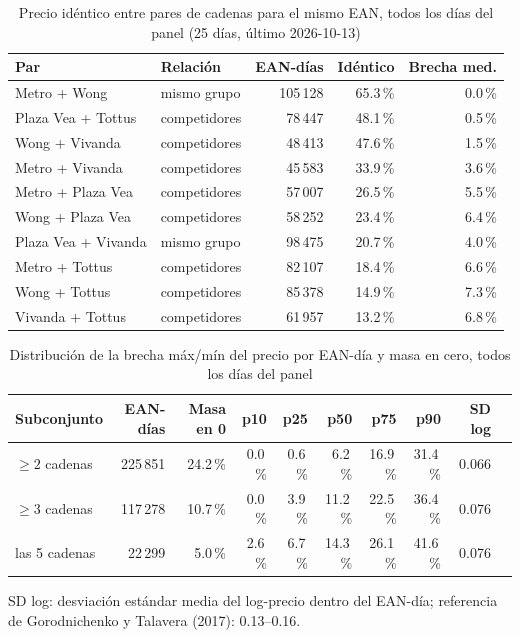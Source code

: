 
\begin{table}[htbp]
\caption{Precio id\'entico entre pares de cadenas para el mismo EAN, todos los d\'ias del panel (25 d\'ias, \'ultimo 2026-10-13)}
\label{tab:identidad}
\centering\scriptsize\setlength{\tabcolsep}{3pt}
\begin{tabular}{@{}llrrr@{}}
\toprule
Par & Relaci\'on & EAN-d\'ias & Id\'entico & Brecha med. \\
\midrule
Metro + Wong & mismo grupo & 105\,128 & 65.3\,\% & 0.0\,\% \\
Plaza Vea + Tottus & competidores & 78\,447 & 48.1\,\% & 0.5\,\% \\
Wong + Vivanda & competidores & 48\,413 & 47.6\,\% & 1.5\,\% \\
Metro + Vivanda & competidores & 45\,583 & 33.9\,\% & 3.6\,\% \\
Metro + Plaza Vea & competidores & 57\,007 & 26.5\,\% & 5.5\,\% \\
Wong + Plaza Vea & competidores & 58\,252 & 23.4\,\% & 6.4\,\% \\
Plaza Vea + Vivanda & mismo grupo & 98\,475 & 20.7\,\% & 4.0\,\% \\
Metro + Tottus & competidores & 82\,107 & 18.4\,\% & 6.6\,\% \\
Wong + Tottus & competidores & 85\,378 & 14.9\,\% & 7.3\,\% \\
Vivanda + Tottus & competidores & 61\,957 & 13.2\,\% & 6.8\,\% \\
\bottomrule\end{tabular}\end{table}

\begin{table}[t]
\caption{Distribuci\'on de la brecha m\'ax/m\'in del precio por EAN-d\'ia y masa en cero, todos los d\'ias del panel}
\label{tab:brecha}
\centering\scriptsize\setlength{\tabcolsep}{4pt}
\begin{tabular}{@{}lrrrrrrrrr@{}}
\toprule
Subconjunto & EAN-d\'ias & Masa en 0 & p10 & p25 & p50 & p75 & p90 & SD log \\
\midrule
$\geq 2$ cadenas & 225\,851 & 24.2\,\% & 0.0\,\% & 0.6\,\% & 6.2\,\% & 16.9\,\% & 31.4\,\% & 0.066 \\
$\geq 3$ cadenas & 117\,278 & 10.7\,\% & 0.0\,\% & 3.9\,\% & 11.2\,\% & 22.5\,\% & 36.4\,\% & 0.076 \\
las 5 cadenas & 22\,299 & 5.0\,\% & 2.6\,\% & 6.7\,\% & 14.3\,\% & 26.1\,\% & 41.6\,\% & 0.076 \\
\bottomrule\end{tabular}
\par\smallskip\raggedright\scriptsize SD log: desviaci\'on est\'andar media del log-precio dentro del EAN-d\'ia; referencia de Gorodnichenko y Talavera (2017): 0.13--0.16.
\end{table}

